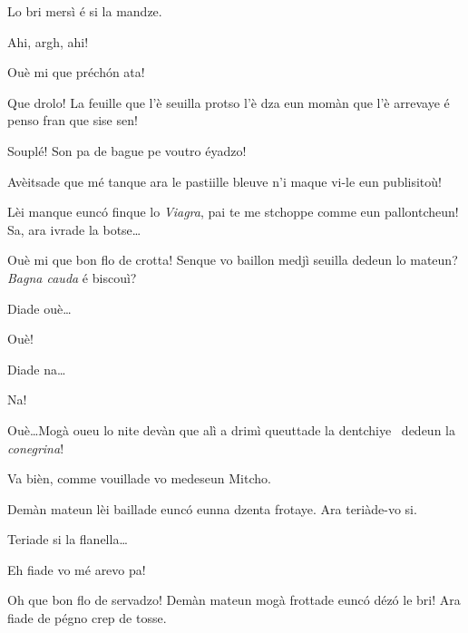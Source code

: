 \begin{drama}
\MedMitchospeaks Lo bri mersì é si la mandze.


\Casimirspeaks{} Ahi, argh, ahi!

\MedMitchospeaks Ouè mi que préch\'on ata! 

\Casimirspeaks Que drolo! La feuille que l’è seuilla protso l’è dza eun momàn que l’è arrevaye é penso fran que sise sen!

\MedMitchospeaks Souplé! Son pa de bague pe voutro éyadzo!

\Casimirspeaks Avèitsade que mé tanque ara le pastiille bleuve n’i maque vi-le eun publisitoù!

\MedMitchospeaks Lèi manque eunc\'o finque lo \textit{Viagra}, pai te me stchop\-pe comme eun pallontcheun! Sa, ara ivrade la botse\ldots


\MedMitchospeaks Ouè mi que bon flo de crotta! Senque vo baillon medjì seuilla dedeun lo mateun? \textit{Bagna cauda} é biscouì? 


\MedMitchospeaks Diade ouè\ldots

\Casimirspeaks{} Ouè!

\MedMitchospeaks Diade na\ldots

\Casimirspeaks{} Na!

\MedMitchospeaks Ouè\ldots Mogà oueu lo nite devàn que alì a drimì queuttade la dentchiye \dentiera\ dedeun la \textit{conegrina}!

\Casimirspeaks Va bièn, comme vouillade vo medeseun Mitcho.

\MedMitchospeaks Demàn mateun lèi baillade eunc\'o eunna dzenta frotaye. Ara teriàde-vo si.


\MedMitchospeaks Teriade si la flanella\ldots

\Casimirspeaks  Eh fiade vo mé arevo pa!

\MedMitchospeaks{} Oh que bon flo de servadzo! Demàn mateun mogà frottade eunc\'o déz\'o le bri! Ara fiade de pégno crep de tosse.


\end{drama}
